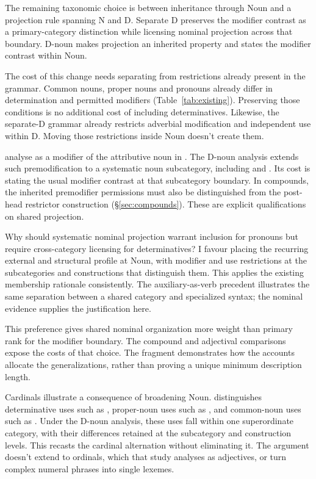 \documentclass[12pt]{article}
\begin{document}
The remaining taxonomic choice is between inheritance through Noun and a projection rule spanning N and D. Separate D preserves the modifier contrast as a primary-category distinction while licensing nominal projection across that boundary. D-noun makes projection an inherited property and states the modifier contrast within Noun.

The cost of this change needs separating from restrictions already present in the grammar. Common nouns, proper nouns and pronouns already differ in determination and permitted modifiers (Table~\ref{tab:existing}). Preserving those conditions is no additional cost of including determinatives. Likewise, the separate-D grammar already restricts adverbial modification and independent use within D. Moving those restrictions inside Noun doesn't create them.

\textcite[75, n.~3]{payne2010} analyse  as a modifier of the attributive noun  in . The D-noun analysis extends such premodification to a systematic noun subcategory, including  and . Its cost is stating the usual modifier contrast at that subcategory boundary. In compounds, the inherited premodifier permissions must also be distinguished from the post-head restrictor construction (§\ref{sec:compounds}). These are explicit qualifications on shared projection.

Why should systematic nominal projection warrant inclusion for pronouns but require cross-category licensing for determinatives? I favour placing the recurring external and structural profile at Noun, with modifier and use restrictions at the subcategories and constructions that distinguish them. This applies the existing membership rationale consistently. The auxiliary-as-verb precedent illustrates the same separation between a shared category and specialized syntax; the nominal evidence supplies the justification here.

This preference gives shared nominal organization more weight than primary rank for the modifier boundary. The compound and adjectival comparisons expose the costs of that choice. The fragment demonstrates how the accounts allocate the generalizations, rather than proving a unique minimum description length.

Cardinals illustrate a consequence of broadening Noun. \textcite{reynolds2026numerals} distinguishes determinative uses such as , proper-noun uses such as , and common-noun uses such as . Under the D-noun analysis, these uses fall within one superordinate category, with their differences retained at the subcategory and construction levels. This recasts the cardinal alternation without eliminating it. The argument doesn't extend to ordinals, which that study analyses as adjectives, or turn complex numeral phrases into single lexemes.
\end{document}
